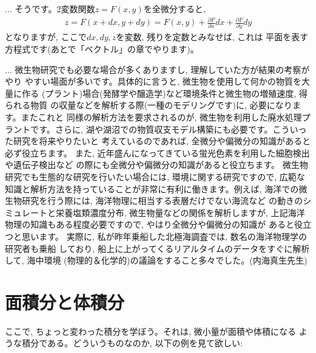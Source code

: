 \begin{faq}{\small{} 
... そうです。2変数関数$z=F(x, y)$を全微分すると,
\begin{eqnarray*}
z=F(x+dx, y+dy)=F(x, y)+\frac{\partial F}{\partial x}dx+\frac{\partial F}{\partial y}dy
\end{eqnarray*}
となりますが, ここで$dx, dy, z$を変数, 残りを定数とみなせば, これは
平面を表す方程式です(あとで「ベクトル」の章でやります)。}\end{faq}
\mv


\begin{faq}{\small{}
... 微生物研究でも必要な場合が多くありますし, 理解していた方が結果の考察がやり
やすい場面が多いです。具体的に言うと, 微生物を使用して何かの物質を大量に作る
(プラント)場合(発酵学や醸造学)など環境条件と微生物の増殖速度, 得られる物質
の収量などを解析する際(一種のモデリングです)に, 必要になります。またこれと
同様の解析方法を要求されるのが, 微生物を利用した廃水処理プラントです。さらに, 
湖や湖沼での物質収支モデル構築にも必要です。こういった研究を将来やりたいと
考えているのであれば, 全微分や偏微分の知識があると必ず役立ちます。
また, 近年盛んになってきている蛍光色素を利用した細胞検出や遺伝子検出など
の際にも全微分や偏微分の知識があると役立ちます。
微生物研究でも生態的な研究を行いたい場合には, 環境に関する研究ですので, 
広範な知識と解析方法を持っていることが非常に有利に働きます。例えば, 
海洋での微生物研究を行う際には, 海洋物理に相当する表層だけでない海流など
の動きのシミュレートと栄養塩類濃度分布, 微生物量などの関係を解析しますが, 
上記海洋物理の知識もある程度必要ですので, やはり全微分や偏微分の知識が
あると役立つと思います。
実際に, 私が昨年乗船した北極海調査では, 数名の海洋物理学の研究者も乗船
しており, 船上に上がってくるリアルタイムのデータをすぐに解析して, 海中環境
(物理的＆化学的)の議論をすること多々でした。(内海真生先生)}\end{faq}
\mv


\section{面積分と体積分}\label{sect:mensekibun}

ここで, ちょっと変わった積分を学ぼう。それは, 微小量が面積や体積になる
ような積分である。どういうものなのか, 以下の例を見て欲しい:

